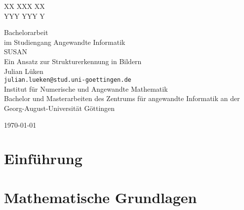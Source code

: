 \documentclass[a4paper, 11pt]{report}
\newcommand{\mytitle}{\LARGE}
\newcommand{\titlespace}{\vspace{6em}}
\theoremstyle{definition}
\newenvironment{myAbstract}{\section*{Abstract}}{}
\begin{document}
\begin{titlepage}
	\begin{center}
		\begin{minipage}{.49\textwidth}
			\flushleft
			
		\end{minipage}
		\begin{minipage}{.49\textwidth}
			\flushright
			XX XXX XX\\
			YYY YYY Y
		\end{minipage}
		\begin{minipage}{.5\textwidth}
			\begin{center}
				\vspace{2cm}
				\mytitle 		{Bachelorarbeit}\\
				\normalsize 	im Studiengang \glqq Angewandte Informatik\grqq\\
				\titlespace
				\mytitle 		{SUSAN}\\
				\normalsize 	Ein Ansatz zur Strukturerkennung in Bildern\\
				
				\titlespace		Julian Lüken\\
								\texttt{julian.lueken@stud.uni-goettingen.de}\\
				\titlespace		Institut für Numerische und Angewandte Mathematik\\
				\titlespace		Bachelor und Masterarbeiten des Zentrums für angewandte Informatik an der Georg-August-Universität Göttingen
				
				\titlespace		\today
			\end{center}
		\end{minipage}
	\end{center}
\end{titlepage}

\restoregeometry
{}
\pagestyle{empty}


\tableofcontents
\pagebreak
\restoregeometry
\pagestyle{headings}

\chapter{Einführung}

\chapter{Mathematische Grundlagen}
\end{document}
